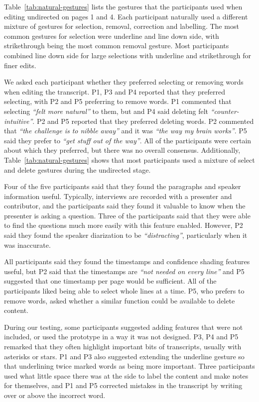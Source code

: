 Table~\ref{tab:natural-gestures} lists the gestures that the participants used when editing undirected on pages 1 and
4.  Each participant naturally used a different mixture of gestures for selection, removal, correction and labelling.
The most common gestures for selection were underline and line down side, with strikethrough being the most common
removal gesture.  Most participants combined line down side for large selections with underline and strikethrough for
finer edits.

We asked each participant whether they preferred selecting or removing words when editing the transcript.  P1, P3 and
P4 reported that they preferred selecting, with P2 and P5 preferring to remove words.  P1 commented that selecting
\textit{``felt more natural''} to them, but and P4 said deleting felt \textit{``counter-intuitive''}.  P2 and P5
reported that they preferred deleting words. P2 commented that \textit{``the challenge is to nibble away''} and it was
\textit{``the way my brain works''}.  P5 said they prefer to \textit{``get stuff out of the way''}.  All of the
participants were certain about which they preferred, but there was no overall consensus. Additionally,
Table~\ref{tab:natural-gestures} shows that most participants used a mixture of select and delete gestures during the
undirected stage.

Four of the five participants said that they found the paragraphs and speaker information useful. Typically, interviews
are recorded with a presenter and contributor, and the participants said they found it valuable to know when the
presenter is asking a question. Three of the participants said that they were able to find the questions much more
easily with this feature enabled. However, P2 said they found the speaker diarization to be \textit{``distracting''},
particularly when it was inaccurate.

All participants said they found the timestamps and confidence shading features
useful, but P2 said that the timestamps are \textit{``not needed on every line''} and P5 suggested that one timestamp
per page would be sufficient. All of the participants liked being able to select whole lines at a time. P5, who prefers
to remove words, asked whether a similar function could be available to delete content.

During our testing, some participants suggested adding features that were not included, or used the prototype in a way
it was not designed.  P3, P4 and P5 remarked that they often highlight important bits of transcripts, usually with
asterisks or stars.  P1 and P3 also suggested extending the underline gesture so that underlining twice marked words as
being more important.  Three participants used what little space there was at the side to label the content and make
notes for themselves, and P1 and P5 corrected mistakes in the transcript by writing over or above the incorrect word.

